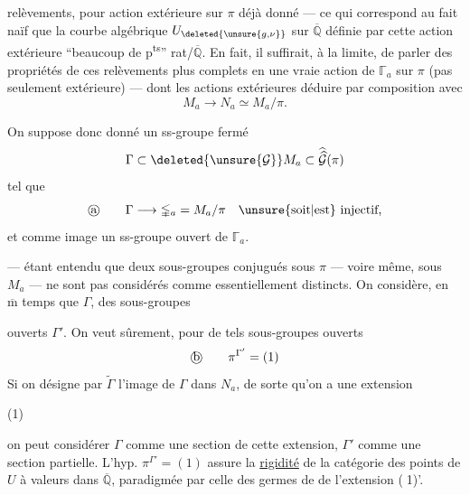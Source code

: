 
 relèvements, pour  action extérieure sur $\pi$ déjà donné --- ce qui correspond au fait naïf que la courbe algébrique $U_{\deleted{\unsure{g,\nu}}}$ sur $\overline{\mathbb Q}$ définie par cette action extérieure  ``beaucoup de p\textsuperscript{ts}'' rat/$\overline{\mathbb Q}$. En fait, il suffirait, à la limite, de parler des  propriétés de ces relèvements plus complets en une vraie action de  $\mathbb{\Gamma}_a$ sur $\pi$ (pas seulement extérieure) --- dont les actions extérieures   déduire par composition avec
\[
M_a \longrightarrow N_a \simeq M_a/\pi.
\]

 On suppose donc donné un ss-groupe fermé
\[
\Gamma \subset \deleted{\unsure{\mathcal G}} M_a \subset \widehat{\widehat{\mathcal G}}(\pi)
\]
tel que
\[
\text{\textcircled{a}}\qquad
\Gamma \longrightarrow \mathbb{\Gamma}_a
 = M_a/\pi
\quad \text{\unsure{soit|est} injectif,}
\]
et  comme image un ss-groupe ouvert de $\mathbb{\Gamma}_a$.

--- étant entendu que deux sous-groupes conjugués sous $\pi$ --- voire même,  sous $M_a$ --- ne sont pas considérés comme essentiellement distincts. On considère, en $\overline{\mathrm m}$ temps que $\Gamma$, des sous-groupes


ouverts $\Gamma'$. On veut sûrement, pour de tels sous-groupes ouverts
\[
\text{\textcircled{b}}\qquad \pi^{\Gamma'}=(1)
\]
Si on désigne par $\widetilde{\Gamma}$ l'image de $\Gamma$ dans $N_a$, de sorte qu'on a une extension
\begin{samepage}
(1)\quad
{}
\end{samepage}
on peut considérer $\Gamma$ comme une section de cette extension, $\Gamma'$ comme une section partielle. L'hyp. $\pi^{\Gamma'}=(1)$ assure la \uline{rigidité} de la catégorie des points de $U$ à valeurs dans $\overline{\mathbb Q}$, paradigmée par celle des germes de  de l'extension \textcircled{(1)'}.


